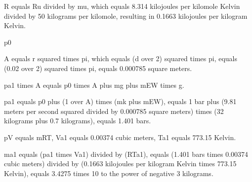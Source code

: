 R equals Ru divided by mu, which equals 8.314 kilojoules per kilomole Kelvin divided by 50 kilograms per kilomole, resulting in 0.1663 kilojoules per kilogram Kelvin.

p0

A equals r squared times pi, which equals (d over 2) squared times pi, equals (0.02 over 2) squared times pi, equals 0.000785 square meters.

pa1 times A equals p0 times A plus mg plus mEW times g.

pa1 equals p0 plus (1 over A) times (mk plus mEW), equals 1 bar plus (9.81 meters per second squared divided by 0.000785 square meters) times (32 kilograms plus 0.7 kilograms), equals 1.401 bars.

pV equals mRT, Va1 equals 0.00374 cubic meters, Ta1 equals 773.15 Kelvin.

ma1 equals (pa1 times Va1) divided by (RTa1), equals (1.401 bars times 0.00374 cubic meters) divided by (0.1663 kilojoules per kilogram Kelvin times 773.15 Kelvin), equals 3.4275 times 10 to the power of negative 3 kilograms.